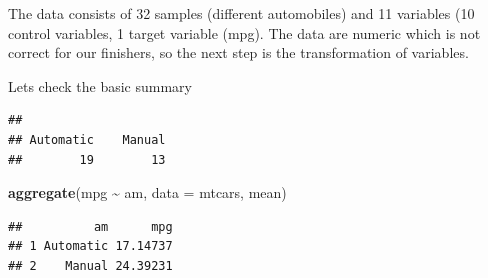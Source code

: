 \documentclass[]{article}
\newenvironment{Shaded}{\begin{snugshade}}{\end{snugshade}}
\newcommand{\DataTypeTok}[1]{\textcolor[rgb]{0.13,0.29,0.53}{#1}}
\newcommand{\KeywordTok}[1]{\textcolor[rgb]{0.13,0.29,0.53}{\textbf{#1}}}
\newcommand{\NormalTok}[1]{#1}
\newcommand{\OperatorTok}[1]{\textcolor[rgb]{0.81,0.36,0.00}{\textbf{#1}}}
\newcommand{\StringTok}[1]{\textcolor[rgb]{0.31,0.60,0.02}{#1}}
\begin{document}
The data consists of 32 samples (different automobiles) and 11 variables
(10 control variables, 1 target variable (mpg). The data are numeric
which is not correct for our finishers, so the next step is the
transformation of variables.

\begin{Shaded}
\end{Shaded}

Lets check the basic summary

\begin{Shaded}
\end{Shaded}

\begin{verbatim}
## 
## Automatic    Manual 
##        19        13
\end{verbatim}

\begin{Shaded}
\begin{Highlighting}[]
\KeywordTok{aggregate}\NormalTok{(mpg }\OperatorTok{\textasciitilde{}}\StringTok{ }\NormalTok{am, }\DataTypeTok{data =}\NormalTok{ mtcars, mean)}
\end{Highlighting}
\end{Shaded}

\begin{verbatim}
##          am      mpg
## 1 Automatic 17.14737
## 2    Manual 24.39231
\end{verbatim}
\end{document}
